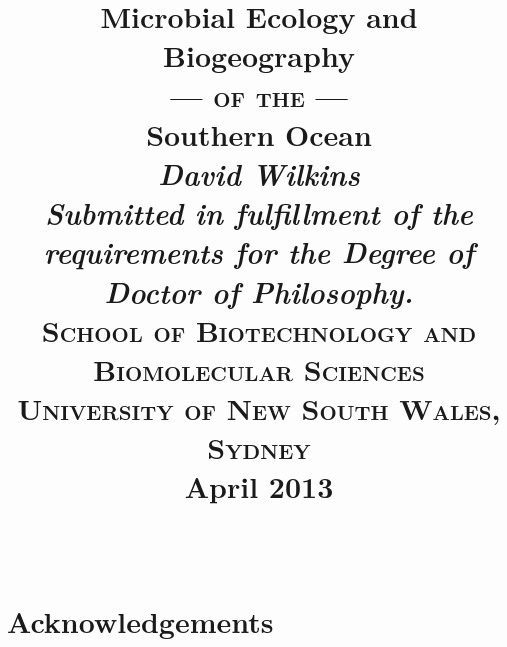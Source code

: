 \documentclass[a4paper]{book}
\begin{document}
\date{}
\title{
  \bigskip
  \Huge{Microbial Ecology and Biogeography}\\ \medskip \vspace{1 mm} \smallskip \smallskip \Large{\textsc{--- of the ---}}\\ \medskip \Huge{Southern Ocean}\\
  \bigskip
  \bigskip
  \bigskip
  \bigskip
  \bigskip
  \bigskip
  \bigskip
  \bigskip
  \huge{\textit{David Wilkins}}
  \vfill
  \small{
    \large{\adfdoubleflourishright}\\
    \smallskip
    \textit{Submitted in fulfillment of the requirements for the Degree of Doctor of Philosophy.}\\
    \medskip
    \textsc{School of Biotechnology and Biomolecular Sciences\\
    University of New South Wales, Sydney}\\
    \medskip
    \large{\textbf{April 2013}}\\
    \smallskip
    \large{\adfdoubleflourishright}\\
  }
  \medskip
}

\maketitle








\tableofcontents

\listoffigures
{}

\listoftables
{}

\singlespacing
\printglossary[type=\acronymtype]
\onehalfspacing

\chapter*{Acknowledgements}

\clearpage
{}

\glsresetall


\glsresetall


\glsresetall


\glsresetall


\glsresetall


\glsresetall


\singlespacing
{}


\end{document}
